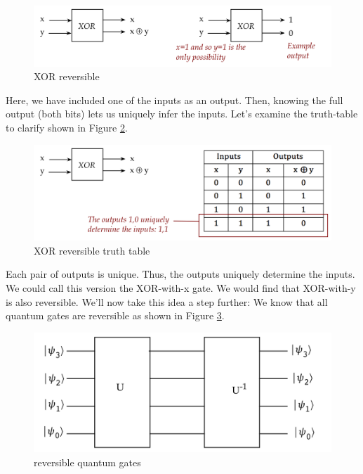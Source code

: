 \documentclass[main.tex]{subfiles}
\begin{document}
    \begin{figure}
        \centering
        \includegraphics[width=5in]{notes/figs/n10/13xor-gate3.png}
        \caption{XOR reversible}
        \label{fig:13xor-gate3}
    \end{figure}
    
    Here, we have included one of the inputs as an output. Then, knowing the full output (both bits) lets us uniquely infer the inputs. Let's examine the truth-table to clarify shown in Figure \ref{fig:14xor-gate4}.
    
    \begin{figure}
        \centering
        \includegraphics[width=5in]{notes/figs/n10/14xor-gate4.png}
        \caption{XOR reversible truth table}
        \label{fig:14xor-gate4}
    \end{figure}
    
    Each pair of outputs is unique. Thus, the outputs uniquely determine the inputs. We could call this version the XOR-with-x gate. We would find that XOR-with-y is also reversible. We'll now take this idea a step further: We know that all quantum gates are reversible as shown in Figure \ref{fig:15quantum-gate}.
    
    \begin{figure}
        \centering
        \includegraphics[width=5in]{notes/figs/n10/15quantum-gate.png}
        \caption{reversible quantum gates}
        \label{fig:15quantum-gate}
    \end{figure}
    
\end{document}

